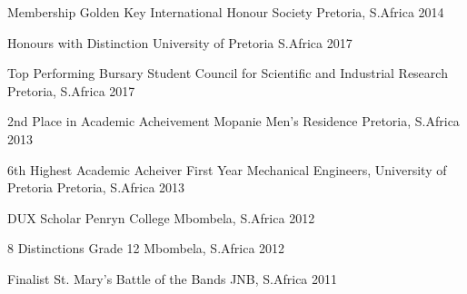



\begin{cvhonors}

  \cvhonor
    {Membership} %
    {Golden Key International Honour Society} %
    {Pretoria, S.Africa} %
    {2014} %

\end{cvhonors}
\begin{cvhonors}

  \cvhonor
    {Honours with Distinction} %
    {University of Pretoria} %
    {S.Africa} %
    {2017} %

  \cvhonor
    {Top Performing Bursary Student} %
    {Council for Scientific and Industrial Research} %
    {Pretoria, S.Africa} %
    {2017} %

  \cvhonor
    {2nd Place in Academic Acheivement} %
    {Mopanie Men's Residence} %
    {Pretoria, S.Africa} %
    {2013} %

  \cvhonor
    {6th Highest Academic Acheiver} %
    {First Year Mechanical Engineers, University of Pretoria} %
    {Pretoria, S.Africa} %
    {2013} %

  \cvhonor
    {DUX Scholar} %
    {Penryn College} %
    {Mbombela, S.Africa} %
    {2012} %

  \cvhonor
    {8 Distinctions} %
    {Grade 12} %
    {Mbombela, S.Africa} %
    {2012} %

  \cvhonor
    {Finalist} %
    {St. Mary's Battle of the Bands} %
    {JNB, S.Africa} %
    {2011} %

\end{cvhonors}
